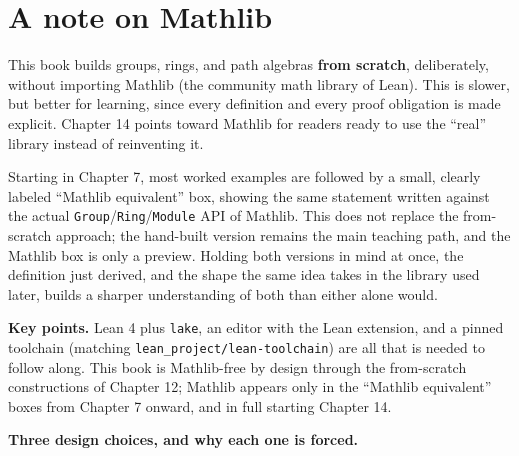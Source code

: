 \section{A note on Mathlib}\label{sec:00-setup:04-mathlib-note:1}

This book builds groups, rings, and path algebras \textbf{from scratch}, deliberately, without importing Mathlib (the community math library of Lean). This is slower, but better for learning, since every definition and every proof obligation is made explicit. Chapter 14 points toward Mathlib for readers ready to use the ``real'' library instead of reinventing it.

Starting in Chapter 7, most worked examples are followed by a small, clearly labeled ``Mathlib equivalent'' box, showing the same statement written against the actual \texttt{Group}/\texttt{Ring}/\texttt{Module} API of Mathlib. This does not replace the from-scratch approach; the hand-built version remains the main teaching path, and the Mathlib box is only a preview. Holding both versions in mind at once, the definition just derived, and the shape the same idea takes in the library used later, builds a sharper understanding of both than either alone would.

\textbf{Key points.} Lean 4 plus \texttt{lake}, an editor with the Lean extension, and a pinned toolchain (matching \texttt{lean\_\allowbreak{}project/\allowbreak{}lean-\allowbreak{}toolchain}) are all that is needed to follow along. This book is Mathlib-free by design through the from-scratch constructions of Chapter 12; Mathlib appears only in the ``Mathlib equivalent'' boxes from Chapter 7 onward, and in full starting Chapter 14.

\textbf{Three design choices, and why each one is forced.}

